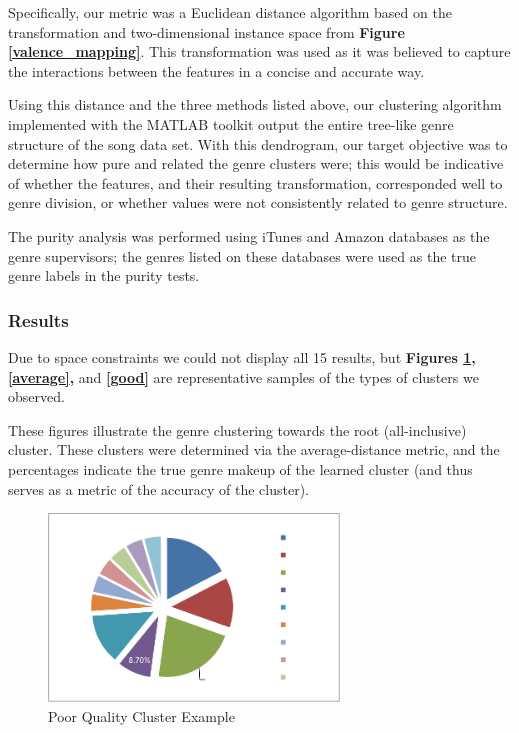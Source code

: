 \documentclass{article}
\begin{document}
Specifically, our metric was a Euclidean distance algorithm based on the
transformation and two-dimensional instance space from \textbf{Figure
\ref{valence_mapping}}. This transformation was used as it was believed to
capture the interactions between the features in a concise and accurate way.

Using this distance and the three methods listed above, our clustering algorithm
implemented with the MATLAB toolkit output the entire tree-like genre structure
of the song data set. With this dendrogram, our target objective was to
determine how pure and related the genre clusters were; this would be indicative
of whether the features, and their resulting transformation, corresponded well
to genre division, or whether values were not consistently related to genre
structure.

The purity analysis was performed using iTunes and Amazon databases as the genre
supervisors; the genres listed on these databases were used as the true genre
labels in the purity tests.

\subsubsection{Results}
Due to space constraints we could not display all 15 results, but
\textbf{Figures \ref{poor}, \ref{average},} and \textbf{\ref{good}} are
representative samples of the types of clusters we observed.

These figures illustrate the genre clustering towards the root (all-inclusive)
cluster. These clusters were determined via the average-distance metric, and the
percentages indicate the true genre makeup of the learned cluster (and thus
serves as a metric of the accuracy of the cluster).

\begin{figure}[H]
\begin{adjustbox}{minipage=\fboxrule,bgcolor=gray, frame}
    \centering
	\includegraphics[width=\textwidth, height = 50mm]{../images/c1.png}
\caption{Poor Quality Cluster Example}
\label{poor}
\end{adjustbox}
\end{figure}
\end{document}
